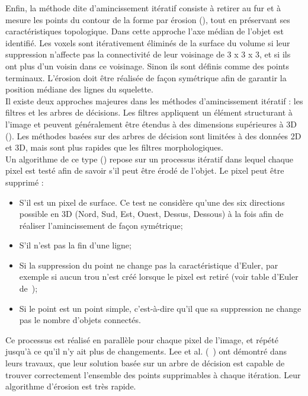 Enfin, la méthode dite d’amincissement itératif consiste à retirer au fur et à mesure les points du contour de la forme par érosion (\cite{Palagyi2002}), tout en préservant ses caractéristiques topologique. Dans cette approche l’axe médian de l’objet est identifié. Les voxels sont itérativement éliminés de la surface du volume si leur suppression n’affecte pas la connectivité de leur voisinage de 3 x 3 x 3, et si ils ont plus d’un voisin dans ce voisinage. Sinon ils sont définis comme des points terminaux. L’érosion doit être réalisée de façon symétrique afin de garantir la position médiane des lignes du squelette.\\

Il existe deux approches majeures dans les méthodes d’amincissement itératif : les filtres et  les arbres de décisions. Les filtres appliquent un élément structurant à l’image et peuvent généralement être étendus à des dimensions supérieures à 3D  (\cite{Jonker2000}). Les méthodes basées sur des arbres de décision sont limitées à des données 2D et 3D, mais sont plus rapides que les filtres morphologiques. \\
Un algorithme de ce type (\cite{Lee1994}) repose sur un processus itératif dans lequel chaque pixel est testé afin de savoir s’il peut être érodé de l’objet. Le pixel peut être supprimé : 
\begin{itemize}
\item S’il est un pixel de surface. Ce test ne considère qu’une des six directions possible en 3D (Nord, Sud, Est, Ouest, Dessus, Dessous) à la fois afin de réaliser l’amincissement de façon symétrique;
\item S’il n’est pas la fin d’une ligne;
\item Si la suppression du point ne change pas la caractéristique d’Euler, par exemple si aucun trou n’est créé lorsque le pixel est retiré (voir table d’Euler de~\cite{Lee1994});
\item Si le point est un point simple, c’est-à-dire qu’il que sa suppression ne change pas le nombre d’objets connectés.
\end{itemize}
Ce processus est réalisé en parallèle pour chaque pixel de l’image, et répété jusqu’à ce qu’il n’y ait plus de changements. Lee et al. (~\cite{Lee1994}) ont démontré dans leurs travaux, que leur solution basée sur un arbre de décision est capable de trouver correctement l’ensemble des points supprimables à chaque itération. Leur algorithme d’érosion est très rapide.\\

